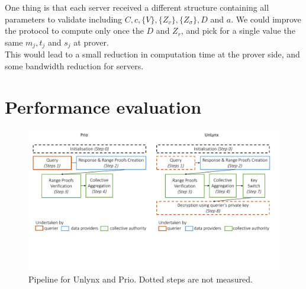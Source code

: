 \documentclass{article}
\begin{document}
One thing is that each server received a different structure containing all parameters to validate including $C, c, \{V\}, \{Z_v\} ,\{ Z_{\sigma}\}, D $ and $a$. We could improve the protocol to compute only once the $D$ and $Z_r$, and pick for a single value the same $m_j, t_j$ and $s_j$ at prover.\\
This would lead to a small reduction in computation time at the prover side, and some bandwidth reduction for servers.

\section{Performance evaluation}

\begin{figure}[H]
\centering
\includegraphics[scale=0.4]{img/pipelines.pdf}
\caption{Pipeline for Unlynx and Prio. Dotted steps are not measured.}
\end{figure}
\end{document}
